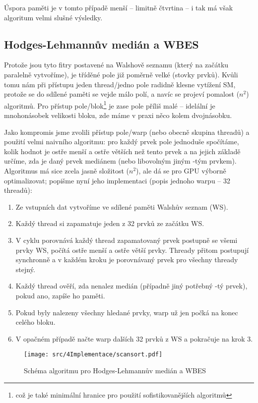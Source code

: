         Úspora paměti je v tomto případě menší -- limitně čtvrtina -- i tak má však algoritum velmi slušné výsledky.

    \subsection{Hodges-Lehmannův medián a WBES}

    Protože jsou tyto fitry postavené na Walshově seznamu (který na začátku paralelně vytvoříme), je tříděné pole již poměrně velké (stovky prvků). Kvůli tomu nám při přístupu jeden thread/jedno pole radidně klesne vytížení SM, protože se do sdílené paměti se vejde málo polí, a navíc se projeví pomalost \OOO($n^2$) algoritmů. Pro přístup pole/blok\footnote{což je také minimální hranice pro použití sofistikovanějších algoritmů} je zase pole příliš malé -- idelální je mnohonásobek velikosti bloku, zde máme v praxi něco kolem dvojnásobku.

    Jako kompromis jsme zvolili přístup pole/warp (nebo obecně skupina threadů) a použití velmi naivního algoritmu: pro každý prvek pole jednoduše spočítáme, kolik hodnot je ostře menší a ostře větších než tento prvek a na jejich základě určíme, zda je daný prvek mediánem (nebo libovolným jiným \kk-tým prvkem). Algoritmus má sice zcela jasně složitost \OOO($n^2$), ale dá se pro GPU výborně optimalizovat; popišme nyní jeho implementaci (popis jednoho warpu -- 32 threadů):
    \begin{enumerate}
      \item Ze vstupních dat vytvoříme ve sdílené paměti Walshův seznam (WS).
      \item Každý thread si zapamatuje jeden z 32 prvků ze začátku WS.
      \item V cyklu porovnává každý thread zapamatovaný prvek postupně se všemi prvky WS, počítá ostře menší a ostře větší prvky. Thready přitom postupují synchronně a v každém kroku je porovnávaný prvek pro všechny thready stejný.
      \item Každý thread ověří, zda nenalez medián (případně jiný potřebný \kk-tý prvek), pokud ano, zapíše ho paměti.
      \item Pokud byly nalezeny všechny hledané prvky, warp už jen počká na konec celého bloku.
      \item V opačném případě načte warp dalších 32 prvků z WS a pokračuje na krok 3.
    \end{enumerate}
    \begin{figure}[h]
    \begin{center}
      \texttt{[image: src/4Implementace/scansort.pdf]}
      \caption{Schéma algoritmu pro Hodges-Lehmannův medián a WBES}
    \end{center}
    \end{figure}

